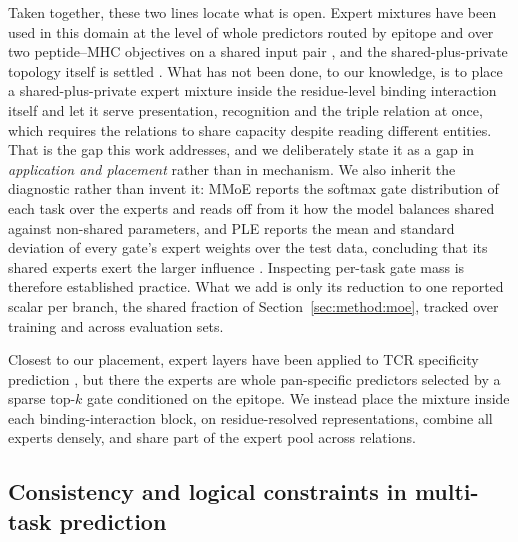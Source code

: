 \documentclass[webpdf,modern,large,namedate]{oup-authoring-template}
\theoremstyle{thmstyleone}
\theoremstyle{thmstyletwo}
\theoremstyle{thmstylethree}
\begin{document}
Taken together, these two lines locate what is open. Expert mixtures have been
used in this domain at the level of whole predictors routed by epitope
\citep{qu2026moetcr} and over two peptide--MHC objectives on a shared input
pair \citep{ma2024neomust}, and the shared-plus-private topology itself is
settled \citep{tang2020ple}. What has not been done, to our knowledge, is to
place a shared-plus-private expert mixture inside the residue-level binding
interaction itself and let it serve presentation, recognition and the triple
relation at once, which requires the relations to share capacity despite
reading different entities. That is the gap this work addresses, and we
deliberately state it as a gap in \emph{application and placement} rather than
in mechanism. We also inherit the diagnostic rather than
invent it: MMoE reports the softmax gate distribution of each task over the
experts and reads off from it how the model balances shared against
non-shared parameters, and PLE reports the mean and standard deviation of every
gate's expert weights over the test data, concluding that its shared experts
exert the larger influence \citep{ma2018mmoe, tang2020ple}. Inspecting per-task
gate mass is therefore established practice. What we add is only its reduction
to one reported scalar per branch, the shared fraction of
Section~\ref{sec:method:moe}, tracked over training and across evaluation sets.

Closest to our placement,
expert layers have been applied to TCR specificity prediction
\citep{qu2026moetcr}, but there the experts are whole pan-specific predictors
selected by a sparse top-$k$ gate conditioned on the epitope. We instead place
the mixture inside each binding-interaction block, on residue-resolved
representations, combine all experts densely, and share part of the expert pool
across relations.

\subsection{Consistency and logical constraints in multi-task
prediction}\label{sec:related:consistency}
\end{document}

